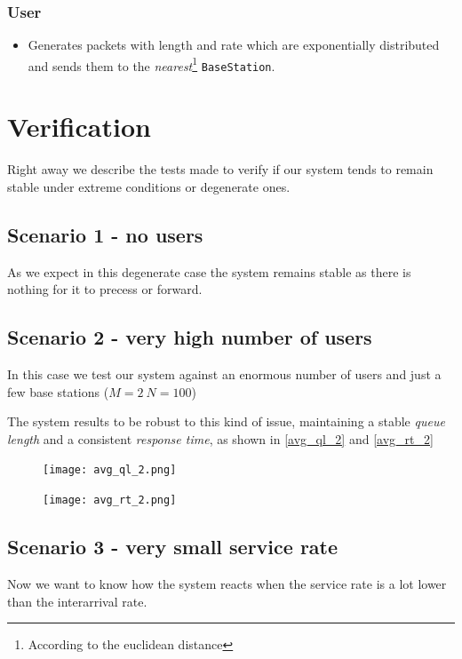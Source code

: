 \documentclass{report}
\begin{document}
\subsection{User}
\begin{itemize}
    \item Generates packets with length and rate which are exponentially distributed and sends them to the \textit{nearest}\footnote{According to the euclidean distance}
    \texttt{BaseStation}.
\end{itemize}

\chapter{Verification}
Right away we describe the tests made to verify if our system tends to remain stable under extreme conditions or degenerate ones.

\section{Scenario 1 - no users}
As we expect in this degenerate case the system remains stable as there is nothing for it to precess or forward.

\section{Scenario 2 - very high number of users}
In this case we test our system against an enormous number of users and just a few base stations ($M=2 \ N=100$)

The system results to be robust to this kind of issue, maintaining a stable \textit{queue length} and a consistent \textit{response time}, as shown in \autoref{avg_ql_2} and \autoref{avg_rt_2}

\begin{figure}[H]
    \centering
    \texttt{[image: avg\_ql\_2.png]}
    \caption{}
    \label{avg_ql_2}
\end{figure}
\begin{figure}[H]
    \centering
    \texttt{[image: avg\_rt\_2.png]}
    \caption{}
    \label{avg_rt_2}
\end{figure}

\section{Scenario 3 - very small service rate}
Now we want to know how the system reacts when the service rate is a lot lower than the interarrival rate.
\end{document}

